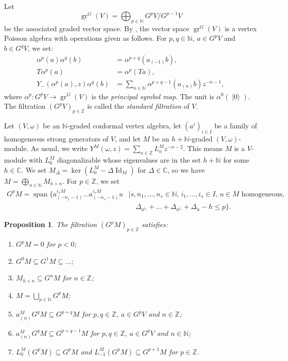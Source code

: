 \documentclass[a4paper, 12pt, reqno]{amsart}
\newtheorem{proposition}[theorem]{Proposition}
\theoremstyle{remark}
\DeclareMathOperator{\Id}{Id}
\DeclareMathOperator{\gr}{gr}
\DeclareMathOperator{\vspan}{span}
\DeclareMathOperator{\vac}{|0\rangle}
\begin{document}
Let
\begin{equation*}
  \gr^G(V) = \bigoplus_{p \in \mathbb{N}}G^pV/G^{p - 1}V
\end{equation*}
be the associated graded vector space.
By \cite{li_vertex_2004}, the vector space $\gr^G(V)$ is a vertex Poisson algebra with operations given as follows.
For $p, q \in \mathbb{N}$, $a \in G^pV$ and $b \in G^qV$, we set:
\begin{align*}
  \alpha^p(a)\alpha^q(b) &= \alpha^{p + q}(a_{(-1)}b), \\
  T\alpha^p(a) &= \alpha^p(Ta), \\
  Y_-(\alpha^p(a), z)\alpha^q(b) &= \sum_{n \in \mathbb{N}}\alpha^{p + q - 1}(a_{(n)}b)z^{-n - 1},
\end{align*}
where $\alpha^p: G^pV \to \gr^G(V)$ is the \emph{principal symbol map}.
The unit is $\alpha^0(\vac)$.
The filtration $(G^pV)_{p \in \mathbb{Z}}$ is called the \emph{standard filtration} of $V$.

Let $(V, \omega)$ be an $\mathbb{N}$-graded conformal vertex algebra, let $(a^i)_{i \in I}$ be a family of homogeneous strong generators of $V$, and let $M$ be an $h + \mathbb{N}$-graded $(V, \omega)$-module.
As usual, we write $Y^M(\omega, z) = \sum_{n \in \mathbb{Z}}L^M_nz^{-n - 2}$.
This means $M$ is a $V$-module with $L_0^M$ diagonalizable whose eigenvalues are in the set $h + \mathbb{N}$ for some $h \in \mathbb{C}$.
We set $M_{\Delta} = \ker(L^M_0 - \Delta\Id_M)$ for $\Delta \in \mathbb{C}$, so we have $M = \bigoplus_{n \in \mathbb{N}}M_{h + n}$.
For $p \in \mathbb{Z}$, we set
\begin{equation*}
  \begin{split}
    G^pM = \vspan\{a^{i_1M}_{(-n_1 - 1)}\dots a^{i_sM}_{(-n_s - 1)}u &\mid \text{$s, n_1, \dots, n_s \in \mathbb{N}$, $i_1, \dots, i_s \in I$, $u \in M$ homogeneous,} \\
                                                                     &\quad \Delta_{a^{i_1}} + \dots + \Delta_{a^{i_s}} + \Delta_u - h \le p\}.
  \end{split}
\end{equation*}

\begin{proposition}
  \label{prp:2}
  The filtration $(G^pM)_{p \in \mathbb{Z}}$ satisfies:
  \begin{enumerate}
  \item $G^pM = 0$ for $p < 0$;
  \item $G^0M \subseteq G^1M \subseteq \dots$;
  \item $M_{h + n} \subseteq G^nM$ for $n \in \mathbb{Z}$;
  \item $M = \bigcup_{p \in \mathbb{N}}G^pM$;
  \item $a^M_{(n)}G^qM \subseteq G^{p + q}M$ for $p, q \in \mathbb{Z}$, $a \in G^pV$ and $n \in \mathbb{Z}$;
  \item $a^M_{(n)}G^qM \subseteq G^{p + q - 1}M$ for $p, q \in \mathbb{Z}$, $a \in G^pV$ and $n \in \mathbb{N}$;
  \item $L^M_0(G^pM) \subseteq G^pM$ and $L^M_{-1}(G^pM) \subseteq G^{p + 1}M$ for $p \in \mathbb{Z}$.
  \end{enumerate}
\end{proposition}
\end{document}
